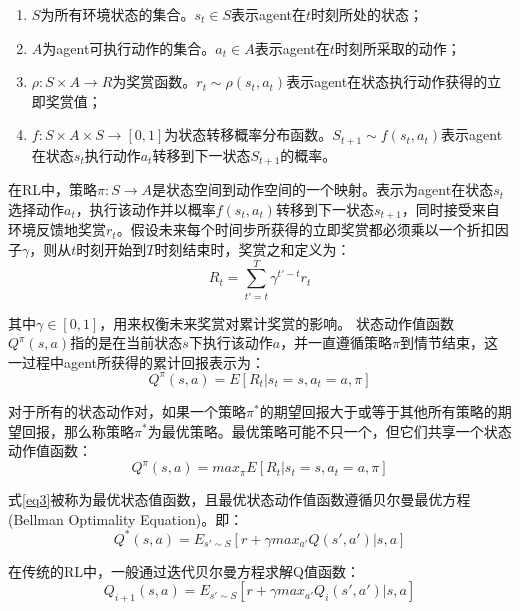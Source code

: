 \documentclass[bachelor]{thesis-uestc}
\begin{document}
	\begin{enumerate}
		\item $S$为所有环境状态的集合。$s_t\in S$表示agent在$t$时刻所处的状态；
		\item $A$为agent可执行动作的集合。$a_t\in A$表示agent在$t$时刻所采取的动作；
		\item $\rho:S\times A\rightarrow R$为奖赏函数。$r_t\sim \rho(s_t,a_t)$表示agent在状态执行动作获得的立即奖赏值；
		\item $f:S\times A\times S\rightarrow [0,1]$为状态转移概率分布函数。$S_{t+1}\sim f(s_t,a_t)$表示agent在状态$s_t$执行动作$a_t$转移到下一状态$S_{t+1}$的概率。
	\end{enumerate}
	
	在RL中，策略$\pi :S\rightarrow A$是状态空间到动作空间的一个映射。表示为agent在状态$s_t$选择动作$a_t$，执行该动作并以概率$f(s_t,a_t)$转移到下一状态$s_{t+1}$，同时接受来自环境反馈地奖赏$r_t$。假设未来每个时间步所获得的立即奖赏都必须乘以一个折扣因子$\gamma$，则从$t$时刻开始到$T$时刻结束时，奖赏之和定义为：
	\begin{equation}\label{eq1}
	R_t=\sum^T_{t'=t}\gamma^{t'-t}r_t
	\end{equation}
	
	其中$\gamma\in [0,1]$，用来权衡未来奖赏对累计奖赏的影响。
	状态动作值函数$Q^\pi (s,a)$指的是在当前状态$s$下执行该动作$a$，并一直遵循策略$\pi$到情节结束，这一过程中agent所获得的累计回报表示为：
	\begin{equation}\label{eq2}
	Q^\pi (s,a)=E[R_t|s_t=s,a_t=a,\pi]
	\end{equation}
	
	对于所有的状态动作对，如果一个策略$\pi ^*$的期望回报大于或等于其他所有策略的期望回报，那么称策略$\pi ^*$为最优策略。最优策略可能不只一个，但它们共享一个状态动作值函数：
	\begin{equation}\label{eq3}
	Q^\pi (s,a)=max_\pi E[R_t|s_t=s,a_t=a,\pi]
	\end{equation}
	
	式\ref{eq3}被称为最优状态值函数，且最优状态动作值函数遵循贝尔曼最优方程(Bellman Optimality Equation)。即：
	\begin{equation}
	\label{eq4}
	Q^*(s,a)=E_{s'\sim S}[r+\gamma max_{a'}Q(s',a')|s,a]
	\end{equation}
	
	在传统的RL中，一般通过迭代贝尔曼方程求解Q值函数：
	\begin{equation}
	\label{eq5}
	Q_{i+1}(s,a)=E_{s'\sim S}[r+\gamma max_{a'}Q_i(s',a')|s,a]
	\end{equation}
	
\end{document}
